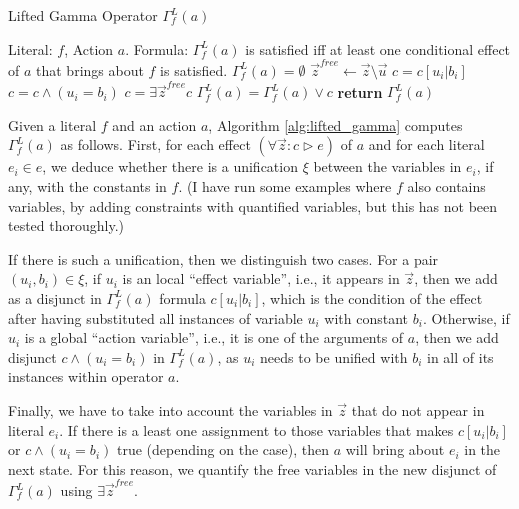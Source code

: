 \documentclass{article}
\def\LGamma{\Gamma^L}
\begin{document}
\begin{algorithm}
    \caption{Lifted Gamma Operator $\LGamma_{f}(a)$}\label{alg:lifted_gamma}
    \begin{algorithmic}[1]
    \Require Literal: $f$, Action $a$.
    \Ensure Formula: $\LGamma_{f}(a)$ is satisfied iff at least one conditional effect of $a$ that brings about $f$ is satisfied. 
    \State$\LGamma_{f}(a)=\emptyset$ %
     
     
        \State$\vec{z}^{free}\gets \vec{z} \setminus \vec{u}$
                \State$c=c[u_i|b_i]$
            \Else {}
                \State$c=c\wedge (u_i=b_i)$
            \EndIf
        \EndFor
        \State$c=\exists \vec{z}^{free} c$
        \State$\LGamma_{f}(a)=\LGamma_{f}(a)\vee c$
    \EndFor
    \EndFor
    \State\textbf{return} $\LGamma_{f}(a)$
\end{algorithmic}
\end{algorithm}

Given a literal $f$ and an action $a$, Algorithm \ref{alg:lifted_gamma} computes $\LGamma_{f}(a)$ as follows. 
%
First, for each effect $(\forall \vec{z}: c\rhd e)$ of $a$ and for each literal $e_i\in e$, we deduce whether there is a unification $\xi$ between the variables in $e_i$, if any, with the constants in $f$.
%
(I have run some examples where $f$ also contains variables, by adding constraints with quantified variables, but this has not been tested thoroughly.)
 
If there is such a unification, then we distinguish two cases.
%
For a pair $(u_i, b_i)\in\xi$, if $u_i$ is an local ``effect variable'', i.e., it appears in $\vec{z}$, then we add as a disjunct in $\LGamma_{f}(a)$ formula $c[u_i|b_i]$, which is the condition of the effect after having substituted all instances of variable $u_i$ with constant $b_i$.
%
Otherwise, if $u_i$ is a global ``action variable'', i.e., it is one of the arguments of $a$, then we add disjunct $c\wedge (u_i{=}b_i)$ in $\LGamma_{f}(a)$, as $u_i$ needs to be unified with $b_i$ in all of its instances within operator $a$.
%

Finally, we have to take into account the variables in $\vec{z}$ that do not appear in literal $e_i$.
%
If there is a least one assignment to those variables that makes $c[u_i|b_i]$ or $c\wedge (u_i{=}b_i)$ true (depending on the case), then $a$ will bring about $e_i$ in the next state. 
%
For this reason, we quantify the free variables in the new disjunct of $\LGamma_{f}(a)$ using $\exists \vec{z}^{free}$.
\end{document}
